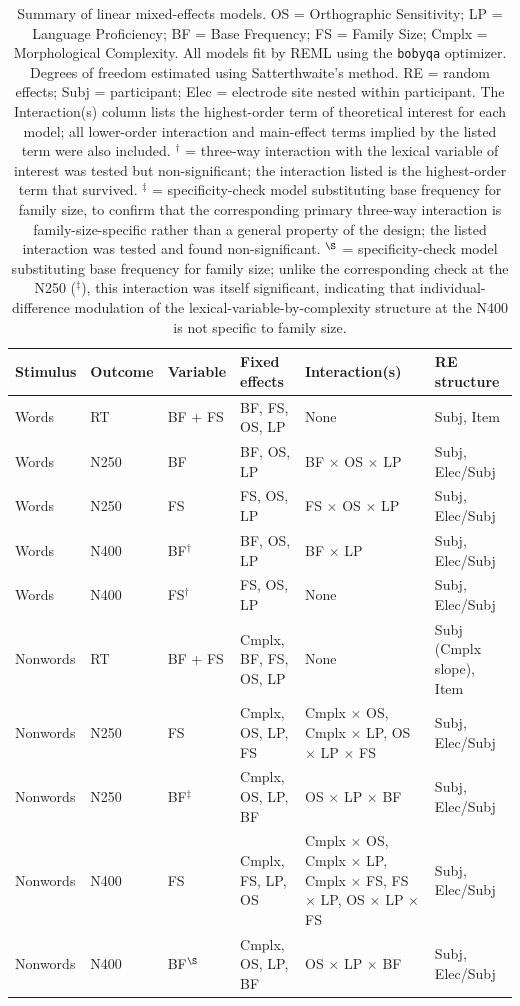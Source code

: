 \documentclass[utf8]{FrontiersinHarvard} %
\begin{document}
	\begin{table}[h!]
		\centering
		\small
		\renewcommand{\arraystretch}{1.4}
		\caption{Summary of linear mixed-effects models. OS = Orthographic Sensitivity; LP = Language Proficiency; BF = Base Frequency; FS = Family Size; Cmplx = Morphological Complexity. All models fit by REML using the \texttt{bobyqa} optimizer. Degrees of freedom estimated using Satterthwaite's method. RE = random effects; Subj = participant; Elec = electrode site nested within participant. The Interaction(s) column lists the highest-order term of theoretical interest for each model; all lower-order interaction and main-effect terms implied by the listed term were also included. $^\dagger$ = three-way interaction with the lexical variable of interest was tested but non-significant; the interaction listed is the highest-order term that survived. $^\ddagger$ = specificity-check model substituting base frequency for family size, to confirm that the corresponding primary three-way interaction is family-size-specific rather than a general property of the design; the listed interaction was tested and found non-significant. $^\S$ = specificity-check model substituting base frequency for family size; unlike the corresponding check at the N250 ($^\ddagger$), this interaction was itself significant, indicating that individual-difference modulation of the lexical-variable-by-complexity structure at the N400 is not specific to family size.}
		\label{tab:models}
		\begin{tabular}{p{1.6cm} p{1.2cm} p{1.3cm} p{3.8cm} p{3.2cm} p{2.5cm}}
			\toprule
			\textbf{Stimulus} & \textbf{Outcome} & \textbf{Variable} & 
			\textbf{Fixed effects} & \textbf{Interaction(s)} & 
			\textbf{RE structure} \\
			\midrule
			Words & RT & BF + FS & BF, FS, OS, LP & None & Subj, Item \\
			Words & N250 & BF & BF, OS, LP & BF $\times$ OS $\times$ LP & Subj, Elec/Subj \\
			Words & N250 & FS & FS, OS, LP & FS $\times$ OS $\times$ LP & Subj, Elec/Subj \\
			Words & N400 & BF$^\dagger$ & BF, OS, LP & BF $\times$ LP & Subj, Elec/Subj \\
			Words & N400 & FS$^\dagger$ & FS, OS, LP & None & Subj, Elec/Subj \\
			Nonwords & RT & BF + FS & Cmplx, BF, FS, OS, LP & None & Subj (Cmplx slope), Item \\
			Nonwords & N250 & FS & Cmplx, OS, LP, FS & Cmplx $\times$ OS, Cmplx $\times$ LP, OS $\times$ LP $\times$ FS & Subj, Elec/Subj \\
			Nonwords & N250 & BF$^\ddagger$ & Cmplx, OS, LP, BF & OS $\times$ LP $\times$ BF & Subj, Elec/Subj \\
			Nonwords & N400 & FS & Cmplx, FS, LP, OS & Cmplx $\times$ OS, Cmplx $\times$ LP, Cmplx $\times$ FS, FS $\times$ LP, OS $\times$ LP $\times$ FS & Subj, Elec/Subj \\
			Nonwords & N400 & BF$^\S$ & Cmplx, OS, LP, BF & OS $\times$ LP $\times$ BF & Subj, Elec/Subj \\
			\bottomrule
		\end{tabular}
	\end{table}
	
\end{document}
